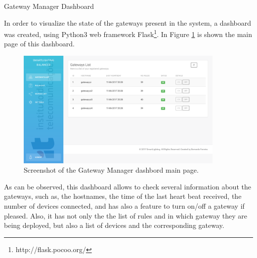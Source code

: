 \begin{Paragraph}{Gateway Manager Dashboard}

In order to visualize the state of the gateways present in the system, a dashboard was created, using Python3 web framework Flask\footnote{http://flask.pocoo.org/}. In Figure \ref{fig:main_gm} is shown the main page of this dashboard.

\begin{figure}[H]
	\centering
	\includegraphics[width=0.9\textwidth]{figures/main_gm.png}
	\caption{Screenshot of the Gateway Manager dashbord main page.}
	\label{fig:main_gm}
\end{figure}

As can be observed, this dashboard allows to check several information about the gateways, such as, the hostnames, the time of the last heart beat received, the number of devices connected, and has also a feature to turn on/off a gateway if pleased. Also, it has not only the the list of rules and in which gateway they are being deployed, but also a list of devices and the corresponding gateway.


\end{Paragraph}

